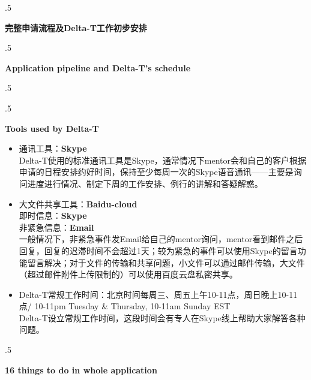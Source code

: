 \documentclass{article}
\begin{document}
\moveleft.5\hoffset\centerline{\huge\bf 完整申请流程及Delta-T工作初步安排}
\vspace{5pt}
\moveleft.5\hoffset\centerline{\large\bf Application pipeline and Delta-T's schedule}
\vspace{15pt}
\moveleft.5\hoffset{}

\vspace{25pt}
\moveleft.5\hoffset\centerline{\textcolor{colorname}{\large\bf Tools used by Delta-T}}
\begin{itemize}
\item{通讯工具：{\bf Skype} \\ Delta-T使用的标准通讯工具是Skype，通常情况下mentor会和自己的客户根据申请的日程安排约好时间，保持至少每周一次的Skype语音通讯——主要是询问进度进行情况、制定下周的工作安排、例行的讲解和答疑解惑。}
\item{大文件共享工具：\textbf{Baidu-cloud} \\
即时信息：{\bf Skype} \\
非紧急信息：{\bf Email} \\ 一般情况下，非紧急事件发Email给自己的mentor询问，mentor看到邮件之后回复，回复的迟滞时间不会超过1天；较为紧急的事件可以使用Skype的留言功能留言解决；对于文件的传输和共享问题，小文件可以通过邮件传输，大文件（超过邮件附件上传限制的）可以使用百度云盘私密共享。 }
\item{Delta-T常规工作时间：北京时间每周三、周五上午10-11点，周日晚上10-11点/ 10-11pm Tuesday \& Thursday, 10-11am Sunday EST \\ Delta-T设立常规工作时间，这段时间会有专人在Skype线上帮助大家解答各种问题。 }
\end{itemize}

\vspace{25pt}
\moveleft.5\hoffset\centerline{\textcolor{colorname}{\large\bf 16 things to do in whole application}}
\end{document}
